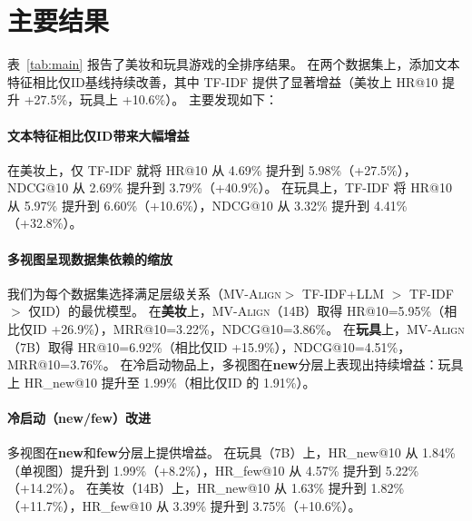 \documentclass[sigconf,natbib=true]{acmart}
\newcommand{\model}{\textsc{MV-Align}\xspace}
\newcommand{\tfidf}{\textsc{TF-IDF}\xspace}
\begin{document}
\section{主要结果}
表~\ref{tab:main} 报告了美妆和玩具游戏的全排序结果。
在两个数据集上，添加文本特征相比仅ID基线持续改善，其中 \tfidf 提供了显著增益（美妆上 HR@10 提升 +27.5\%，玩具上 +10.6\%）。
主要发现如下：

\paragraph{文本特征相比仅ID带来大幅增益}
在美妆上，仅 \tfidf 就将 HR@10 从 4.69\% 提升到 5.98\%（+27.5\%），NDCG@10 从 2.69\% 提升到 3.79\%（+40.9\%）。
在玩具上，\tfidf 将 HR@10 从 5.97\% 提升到 6.60\%（+10.6\%），NDCG@10 从 3.32\% 提升到 4.41\%（+32.8\%）。

\paragraph{多视图呈现数据集依赖的缩放}
我们为每个数据集选择满足层级关系（\model $>$ TF-IDF+LLM $>$ TF-IDF $>$ 仅ID）的最优模型。
在\textbf{美妆}上，\model（14B）取得 HR@10=5.95\%（相比仅ID +26.9\%），MRR@10=3.22\%，NDCG@10=3.86\%。
在\textbf{玩具}上，\model（7B）取得 HR@10=6.92\%（相比仅ID +15.9\%），NDCG@10=4.51\%，MRR@10=3.76\%。
在冷启动物品上，多视图在\textbf{new}分层上表现出持续增益：玩具上 HR\_new@10 提升至 1.99\%（相比仅ID 的 1.91\%）。

\paragraph{冷启动（new/few）改进}
多视图在\textbf{new}和\textbf{few}分层上提供增益。
在玩具（7B）上，HR\_new@10 从 1.84\%（单视图）提升到 1.99\%（+8.2\%），HR\_few@10 从 4.57\% 提升到 5.22\%（+14.2\%）。
在美妆（14B）上，HR\_new@10 从 1.63\% 提升到 1.82\%（+11.7\%），HR\_few@10 从 3.39\% 提升到 3.75\%（+10.6\%）。
\end{document}
